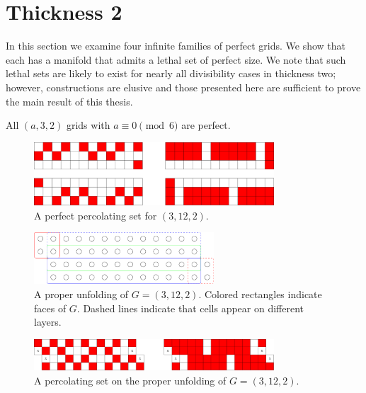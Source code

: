 
\section{Thickness 2}

In this section we examine four infinite families of perfect grids. We show that each has a manifold that admits a lethal set of perfect size. We note that such lethal sets are likely to exist for nearly all divisibility cases in thickness two; however, constructions are elusive and those presented here are sufficient to prove the main result of this thesis.

\begin{con}
All $(a,3,2)$ grids with $a \equiv 0 \pmod 6$ are perfect. 
\end{con}

\begin{figure}[]
\centering
\includegraphics[width=0.8\textwidth]{figures/4/3x12x2.pdf}
\caption{A perfect percolating set for $(3,12,2)$.}
\label{fig:3x12x2}
\end{figure} 

\begin{figure}[]
\centering
\includegraphics[width=0.6\textwidth]{figures/4/3x12x2_manifold.pdf}
\caption{A proper unfolding of $G= (3,12,2)$. Colored rectangles indicate faces of $G$. Dashed lines indicate that cells appear on different layers. }
\label{fig:3x12x2_manifold}
\end{figure} 

\begin{figure}[]
\centering
\includegraphics[width=0.8\textwidth]{figures/4/3x12x2_unfolded_lethal.pdf}
\caption{A percolating set on the proper unfolding of $G= (3,12,2)$.}
\label{fig:3x12x2_unfolded_lethal}
\end{figure} 

